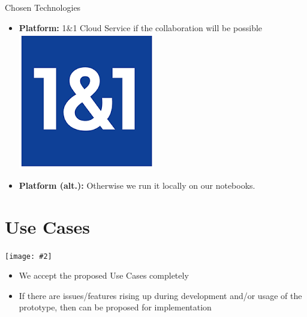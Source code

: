 \documentclass{beamer}
\newcommand{\cgraphic}[2]
{
	\begin{center}
		\texttt{[image: \#2]}
	\end{center}
}%
\begin{document}
\begin{frame}{Chosen Technologies}
\begin{itemize}[<+->]
		\item \textbf{Platform:} 1\&1 Cloud Service if the collaboration will be possible \includegraphics[scale=.07]{11_logo}
		\item \textbf{Platform (alt.):} Otherwise we run it locally on our notebooks.
	\end{itemize}
\end{frame}
\section{Use Cases}
\begin{frame}
	\cgraphic{.12}{architecture_proposal}
		\begin{itemize}[<+->]
			\item We accept the proposed Use Cases completely
			\item If there are issues/features rising up during development and/or usage of the prototype, then can be proposed for implementation
		\end{itemize}
\end{frame}
\end{document}
